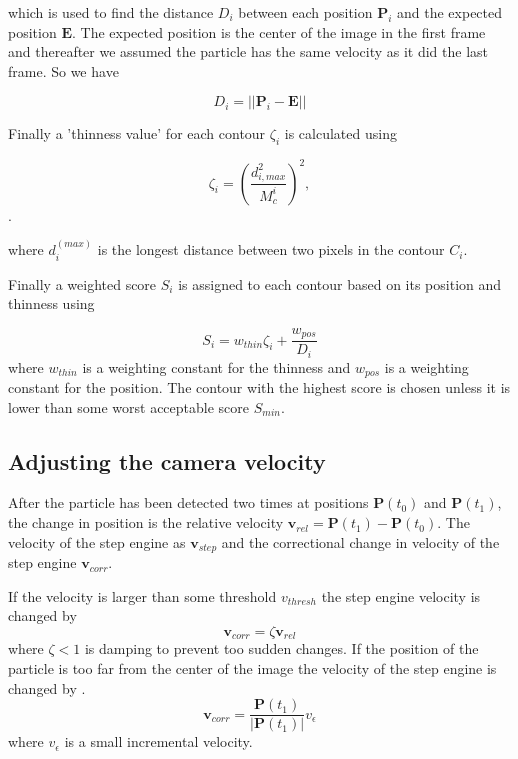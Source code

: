 \noindent which is used to find the distance $D_i$ between each position $\mathbf{P}_i$ and the expected position $\mathbf{E}$. The expected position is the center of the image in the first frame and thereafter we assumed the particle has the same velocity as it did the last frame. So we have 

\[
D_i = \left|\left|\mathbf{P}_i - \mathbf{E}\right|\right|
\]

\noindent Finally a 'thinness value' for each contour $\zeta_i$ is calculated using

\begin{equation}\label{eq:thinness}
\zeta_i =  \left(\frac{d_{i, max}^2}{M_c^i}\right)^2,
\end{equation}. 

\noindent where $d_i^{(max)}$ is the longest distance between two pixels in the contour $C_i$.

Finally a weighted score $S_i$ is assigned to each contour based on its position and thinness using

\begin{equation}
S_i = w_{thin}\zeta_i + \frac{w_{pos}}{D_i}
\end{equation}
\noindent where $w_{thin}$ is a weighting constant for the thinness and $w_{pos}$ is a weighting constant for the position. The contour with the highest score is chosen unless it is lower than some worst acceptable score $S_{min}$. 

\subsection{Adjusting the camera velocity}
After the particle has been detected two times at positions $\mathbf{P}(t_0)$ and $\mathbf{P}(t_1)$, the change in position is the relative velocity $\mathbf{v}_{rel} = \mathbf{P}(t_1) - \mathbf{P}(t_0)$.  The velocity of the step engine as $\mathbf{v}_{step}$ and the correctional change in velocity of the step engine $\mathbf{v}_{corr}$.

If the velocity is larger than some threshold $v_{thresh}$ the step engine velocity is changed by
\[
\mathbf{v}_{corr} = \zeta\mathbf{v}_{rel}
\]
where $\zeta < 1$ is damping to prevent too sudden changes. If the position of the particle is too far from the center of the image the velocity of the step engine is changed by .
\[
\mathbf{v}_{corr} = \frac{\mathbf{P}(t_1)}{\left|\mathbf{P}(t_1)\right|}v_{\epsilon}
\] 
where $v_{\epsilon}$ is a small incremental velocity.



